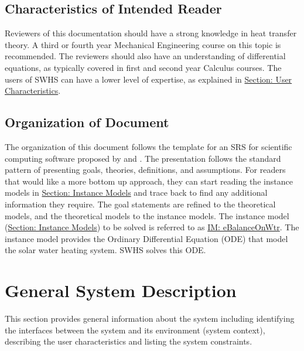 \documentclass[12pt]{article}
\begin{document}
\subsection{Characteristics of Intended Reader}
\label{Sec:ReaderChars}
Reviewers of this documentation should have a strong knowledge in heat transfer theory. A third or fourth year Mechanical Engineering course on this topic is recommended. The reviewers should also have an understanding of differential equations, as typically covered in first and second year Calculus courses. The users of SWHS can have a lower level of expertise, as explained in \hyperref[Sec:UserChars]{Section: User Characteristics}.
\subsection{Organization of Document}
\label{Sec:DocOrg}
The organization of this document follows the template for an SRS for scientific computing software proposed by \cite{dParnas1972} and \cite{parnasClements1984}. The presentation follows the standard pattern of presenting goals, theories, definitions, and assumptions. For readers that would like a more bottom up approach, they can start reading the instance models in \hyperref[Sec:IMs]{Section: Instance Models} and trace back to find any additional information they require.
The goal statements are refined to the theoretical models, and the theoretical models to the instance models. The instance model (\hyperref[Sec:IMs]{Section: Instance Models}) to be solved is referred to as \hyperref[IM:eBalanceOnWtr]{IM: eBalanceOnWtr}. The instance model provides the Ordinary Differential Equation (ODE) that model the solar water heating system. SWHS solves this ODE.
\section{General System Description}
\label{Sec:GenSysDesc}
This section provides general information about the system including identifying the interfaces between the system and its environment (system context), describing the user characteristics and listing the system constraints.
\end{document}
